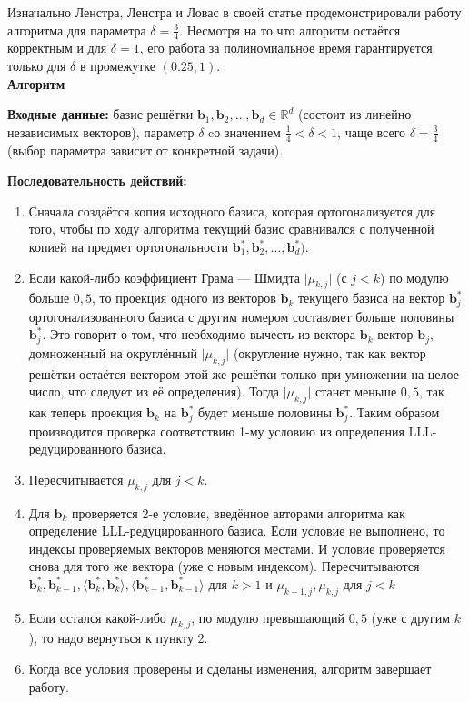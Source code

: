 \documentclass[12pt,a4paper]{scrartcl}
\begin{document}
Изначально Ленстра, Ленстра и Ловас в своей статье продемонстрировали работу алгоритма для параметра $\delta ={\frac {3}{4}}$. Несмотря на то что алгоритм остаётся корректным и для $\delta =1$, его работа за полиномиальное время гарантируется только для $\delta$ в промежутке $(0.25,1)$. \\

\textbf{Алгоритм}

\textbf{Входные данные:} базис решётки $\mathbf {b} _{1},\mathbf {b} _{2},\dots ,\mathbf {b} _{d}\in \mathbb{R}^{d}$ (состоит из линейно независимых векторов),
параметр $\delta$ cо значением ${\frac {1}{4}}<\delta <1$, чаще всего $\delta ={\frac {3}{4}}$ (выбор параметра зависит от конкретной задачи).

\textbf{Последовательность действий:}

\begin{enumerate}
	\item Сначала создаётся копия исходного базиса, которая ортогонализуется для того, чтобы по ходу алгоритма текущий базис сравнивался с полученной копией на предмет ортогональности $\mathbf {b} _{1}^{*},\mathbf {b} _{2}^{*},\dots ,\mathbf {b} _{d}^{*})$.
	
	\item Если какой-либо коэффициент Грама — Шмидта $\vert \mu _{k,j}\vert$ (с $j<k$) по модулю больше $0{,}5$, то проекция одного из векторов $\mathbf {b} _{k}$ текущего базиса на вектор $\mathbf {b} _{j}^{*}$ ортогонализованного базиса с другим номером составляет больше половины $\mathbf {b} _{j}^{*}$. Это говорит о том, что необходимо вычесть из вектора $\mathbf {b} _{k}$ вектор ${\mathbf {b}}_{j}$, домноженный на округлённый $\vert \mu _{k,j}\vert$ (округление нужно, так как вектор решётки остаётся вектором этой же решётки только при умножении на целое число, что следует из её определения). Тогда $\vert \mu _{k,j}\vert$ станет меньше $0{,}5$, так как теперь проекция $\mathbf {b} _{k}$ на $\mathbf {b} _{j}^{*}$ будет меньше половины $\mathbf {b} _{j}^{*}$. Таким образом производится проверка соответствию 1-му условию из определения LLL-редуцированного базиса.
	
	\item Пересчитывается $\mu _{k,j}$ для $j<k$.
	
	\item Для $\mathbf {b} _{k}$ проверяется 2-е условие, введённое авторами алгоритма как определение LLL-редуцированного базиса. Если условие не выполнено, то индексы проверяемых векторов меняются местами. И условие проверяется снова для того же вектора (уже с новым индексом).
	Пересчитываются $\mathbf {b} _{k}^{*},\mathbf {b} _{k-1}^{*},\langle \mathbf {b} _{k}^{*},\mathbf {b} _{k}^{*}\rangle ,\langle \mathbf {b} _{k-1}^{*},\mathbf {b} _{k-1}^{*}\rangle$ для $k>1$ и $\mu _{k-1,j},\mu _{k,j}$ для $j<k$
	
	\item Если остался какой-либо $\mu _{k,j}$, по модулю превышающий $0{,}5$ (уже с другим $k$), то надо вернуться к пункту 2.
	
	\item Когда все условия проверены и сделаны изменения, алгоритм завершает работу.
	
\end{enumerate}
\end{document}
